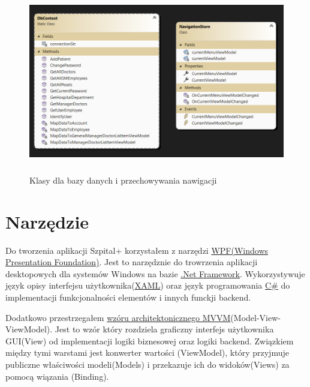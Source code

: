 \begin{figure}[H]
\begin{center}
    \includegraphics[height=8cm]{images/diag_kl_db_nav.png}
    \caption{Klasy dla bazy danych i przechowywania nawigacji}
\end{center}
\end{figure}

\section{Narzędzie}

Do tworzenia aplikacji \textquotedbl Szpital+\textquotedbl{} korzystałem z narzędzi {\color{blue}\href{https://pl.wikipedia.org/wiki/Windows_Presentation_Foundation}{WPF(Windows Presentation Foundation)}}. Jest to narzędznie do trowrzenia aplikacji desktopowych dla systemów Windows na bazie {\color{blue}\href{https://pl.wikipedia.org/wiki/.NET_Framework}{.Net Framework}}. Wykorzystywuje język opisy interfejsu użytkownika({\color{blue}\href{https://pl.wikipedia.org/wiki/Extensible_Application_Markup_Language}{XAML}}\label{href:XAML}) oraz język programowania {\color{blue}\href{https://pl.wikipedia.org/wiki/C_Sharp}{C\#}}\label{href:c_sh} do implementacji funkcjonalności elementów i innych funckji backend. 

Dodatkowo przestrzegałem {\color{blue}\href{https://en.wikipedia.org/wiki/Model%E2%80%93view%E2%80%93viewmodel}{wzóru architektonicznego MVVM}}(Model-View-ViewModel)\label{href:MVVM}. Jest to wzór który rozdziela graficzny interfejs użytkownika GUI(View) od implementacji logiki biznesowej oraz logiki backend. Związkiem między tymi warstami jest konwerter wartości (ViewModel), który przyjmuje publiczne właściwości modeli(Models) i przekazuje ich do widoków(Views) za pomocą wiązania (Binding).

